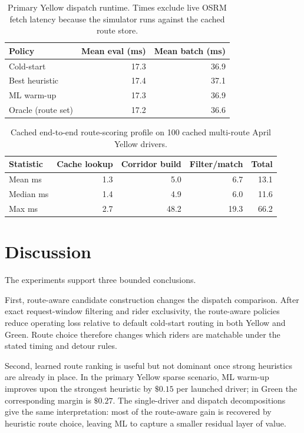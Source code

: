 \documentclass[journal]{IEEEtran}
\begin{document}
\begin{table}[!t]
\caption{Primary Yellow dispatch runtime. Times exclude live OSRM fetch latency because the simulator runs against the cached route store.}
\label{tab:runtime}
\centering
\scriptsize
\setlength{\tabcolsep}{4.0pt}
\begin{tabular}{|l|r|r|}
\hline
Policy & Mean eval (ms) & Mean batch (ms) \\
\hline
Cold-start & 17.3 & 36.9 \\
\hline
Best heuristic & 17.4 & 37.1 \\
\hline
ML warm-up & 17.3 & 36.9 \\
\hline
Oracle (route set) & 17.2 & 36.6 \\
\hline
\end{tabular}
\end{table}

\begin{table}[!t]
\caption{Cached end-to-end route-scoring profile on 100 cached multi-route April Yellow drivers.}
\label{tab:end_to_end_runtime}
\centering
\scriptsize
\setlength{\tabcolsep}{3.6pt}
\begin{tabular}{|l|r|r|r|r|}
\hline
Statistic & Cache lookup & Corridor build & Filter/match & Total \\
\hline
Mean ms & 1.3 & 5.0 & 6.7 & 13.1 \\
\hline
Median ms & 1.4 & 4.9 & 6.0 & 11.6 \\
\hline
Max ms & 2.7 & 48.2 & 19.3 & 66.2 \\
\hline
\end{tabular}
\end{table}

\section{Discussion}
The experiments support three bounded conclusions.

First, route-aware candidate construction changes the dispatch comparison. After exact request-window filtering and rider exclusivity, the route-aware policies reduce operating loss relative to default cold-start routing in both Yellow and Green. Route choice therefore changes which riders are matchable under the stated timing and detour rules.

Second, learned route ranking is useful but not dominant once strong heuristics are already in place. In the primary Yellow sparse scenario, ML warm-up improves upon the strongest heuristic by \(\$0.15\) per launched driver; in Green the corresponding margin is \(\$0.27\). The single-driver and dispatch decompositions give the same interpretation: most of the route-aware gain is recovered by heuristic route choice, leaving ML to capture a smaller residual layer of value.
\end{document}
